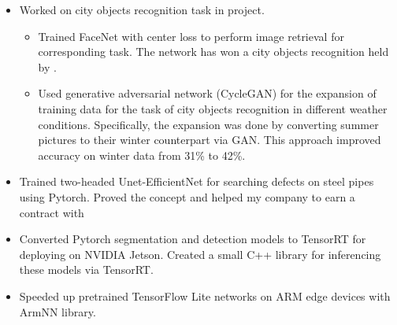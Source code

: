 \documentclass[10pt,a4paper]{altacv}
\newcommand{\MYhref}[3][Navy]{\href{#2}{\color{#1}{#3}}}%
\begin{document}
\begin{itemize}
\item Worked on city objects recognition task in \MYhref{https://www.augmented.city/}{ Augmented.City} project. 
    \begin{itemize}
        \item Trained FaceNet with center loss to perform image retrieval for corresponding task. The network has won a city objects recognition \MYhref{https://fpi.gov.ru/tenders/799/}{competition} held by \MYhref{https://fpi.gov.ru/about/}{{FPI}}.
        \item{Used generative adversarial network (CycleGAN) for the expansion of training data for the task of city objects recognition in different weather conditions. Specifically, the expansion was done by converting summer pictures to their winter counterpart via GAN. This approach improved accuracy on winter data from 31\% to 42\%.}
    \end{itemize}
\item{Trained two-headed Unet-EfficientNet for searching defects on steel pipes using Pytorch. Proved the concept and helped my company to earn a contract with \MYhref{https://www.tmk-group.com/}{{TMK}.}}
\item{Converted Pytorch segmentation and detection models to TensorRT for deploying on NVIDIA Jetson. Created a small C++ library for inferencing these models via TensorRT.}
\item{Speeded up pretrained TensorFlow Lite networks on ARM edge devices with ArmNN library.}
\end{itemize}









\medskip
\end{document}
